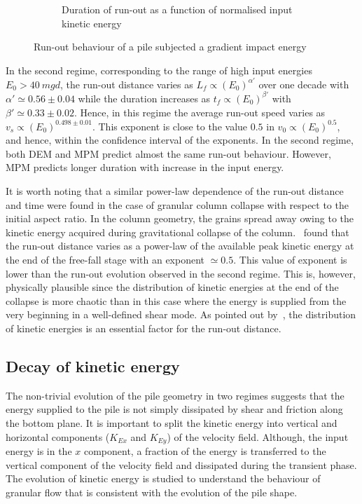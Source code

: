 \begin{figure}[tbph]
\begin{subfigure}[b]{0.975\textwidth}
\caption{Duration of run-out as a function of normalised input kinetic energy}
\label{fig:Tf_vs_Eo_Slope}
\end{subfigure}
\caption{Run-out behaviour of a pile subjected a gradient impact energy}
\label{fig:Slope}
\end{figure}

In the second regime, corresponding to the range of high input energies  $E_0 > 
40 \ mgd$, the run-out distance varies as $L_f \propto (E_0)^{\alpha'}$ over 
one decade with $\alpha' \simeq 0.56\pm 0.04$ while the duration increases as 
$t_f \propto (E_0)^{\beta'}$ with $\beta' \simeq 0.33 \pm 0.02$. Hence, in this 
regime the average run-out speed varies as $v_s \propto (E_0)^{0.498 \pm 
0.01}$. This exponent is close to the value $0.5$ in $v_0 \propto (E_0)^{0.5}$, 
and hence, within the confidence interval of the exponents.
In the second regime, both DEM and MPM predict almost the same run-out 
behaviour. However, MPM predicts longer duration with increase in the input 
energy.

It is worth noting that a similar power-law dependence of the run-out distance 
and time were found in the case of granular column collapse with respect to 
the initial aspect ratio. In the column geometry, the grains spread away 
owing to the kinetic energy acquired during gravitational collapse of the 
column.~\citet{Topin2012} found that the run-out distance varies as a power-law 
of the available peak kinetic energy at the end of the free-fall stage with an 
exponent $\simeq 0.5$. This value of exponent is lower than the run-out 
evolution observed in the second regime. This is, however, physically plausible 
since the distribution of kinetic energies at the end of the collapse 
is more chaotic than in this case where the energy is supplied from the very 
beginning in a well-defined shear mode. As pointed out by~\citet{Staron2005}, 
the distribution of kinetic energies is an essential factor for the run-out 
distance.

\subsection{Decay of kinetic energy}
\label{sec:decay}

The non-trivial evolution of the pile geometry in two regimes suggests that 
the energy supplied to the pile is not simply dissipated by shear and friction 
along the bottom plane. It is important to split the kinetic energy into 
vertical and horizontal components ($K_{Ex}$ and $K_{Ey}$) of the velocity 
field. Although, the input energy is in the $x$ component, a fraction of 
the energy is transferred to the vertical component of the velocity field and 
dissipated during the transient phase. The evolution of kinetic energy is 
studied to understand the behaviour of granular flow that is consistent with 
the evolution of the pile shape.

